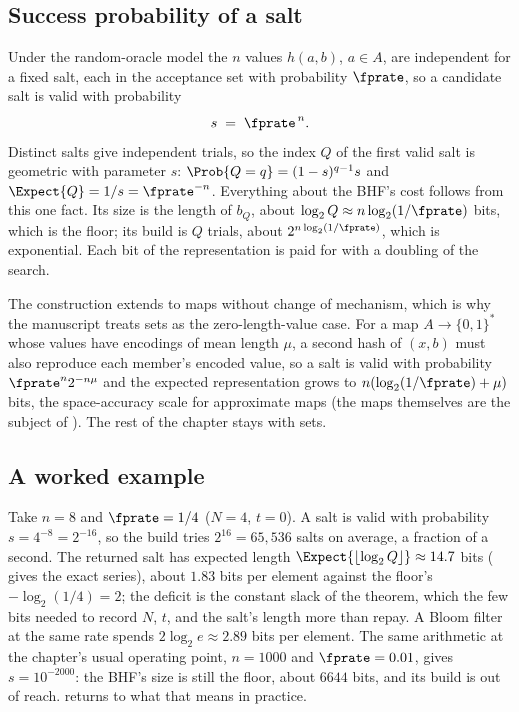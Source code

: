 \subsection*{Success probability of a salt}

Under the random-oracle model the $n$ values $h(a, b)$, $a \in A$, are
independent for a fixed salt, each in the acceptance set with
probability $\fprate$, so a candidate salt is valid with probability
\begin{equation}
\label{eq:bhf-success}
  s \;=\; \fprate^{\,n}.
\end{equation}
Distinct salts give independent trials, so the index $Q$ of the first
valid salt is geometric with parameter $s$: $\Prob{Q = q} = (1 - s)^{q-1}
s$ and $\Expect{Q} = 1/s = \fprate^{-n}$. Everything about the BHF's cost
follows from this one fact. Its size is the length of $b_Q$, about
$\log_2 Q \approx n \log_2(1/\fprate)$ bits, which is the floor; its
build is $Q$ trials, about $2^{n \log_2(1/\fprate)}$, which is
exponential. Each bit of the representation is paid for with a doubling
of the search.

The construction extends to maps without change of mechanism, which is
why the manuscript treats sets as the zero-length-value case. For a map
$A \to \{0, 1\}^{*}$ whose values have encodings of mean length $\mu$, a
second hash of $(x, b)$ must also reproduce each member's encoded value,
so a salt is valid with probability $\fprate^{n} 2^{-n\mu}$ and the
expected representation grows to $n(\log_2(1/\fprate) + \mu)$ bits, the
space-accuracy scale for approximate maps (the maps themselves are the
subject of ). The rest of the chapter
stays with sets.

\subsection*{A worked example}

Take $n = 8$ and $\fprate = 1/4$ ($N = 4$, $t = 0$). A salt is valid with
probability $s = 4^{-8} = 2^{-16}$, so the build tries $2^{16} = 65{,}536$
salts on average, a fraction of a second. The returned salt has expected
length $\Expect{\lfloor \log_2 Q \rfloor} \approx 14.7$ bits
( gives the exact series), about $1.83$ bits per
element against the floor's $-\log_2(1/4) = 2$; the deficit is the
constant slack of the theorem, which the few bits needed to record $N$,
$t$, and the salt's length more than repay. A Bloom filter at the same
rate spends $2 \log_2 e \approx 2.89$ bits per element. The same
arithmetic at the chapter's usual operating point, $n = 1000$ and
$\fprate = 0.01$, gives $s = 10^{-2000}$: the BHF's size is still the
floor, about $6644$ bits, and its build is out of reach.
 returns to what that means in practice.

